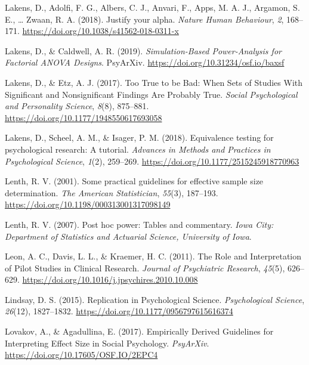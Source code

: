 \documentclass[
  english,
  ,jou, a4paper,floatsintext]{apa6}
\newlength{\cslhangindent}
\newenvironment{cslreferences}%
  {\setlength{\parindent}{0pt}%
  \everypar{\setlength{\hangindent}{\cslhangindent}}\ignorespaces}%
  {\par}
\begin{document}
\begin{cslreferences}
\leavevmode\hypertarget{ref-lakens_justify_2018}{}%
Lakens, D., Adolfi, F. G., Albers, C. J., Anvari, F., Apps, M. A. J., Argamon, S. E., \ldots{} Zwaan, R. A. (2018). Justify your alpha. \emph{Nature Human Behaviour}, \emph{2}, 168--171. \url{https://doi.org/10.1038/s41562-018-0311-x}

\leavevmode\hypertarget{ref-lakens_simulation-based_2019}{}%
Lakens, D., \& Caldwell, A. R. (2019). \emph{Simulation-Based Power-Analysis for Factorial ANOVA Designs}. PsyArXiv. \url{https://doi.org/10.31234/osf.io/baxsf}

\leavevmode\hypertarget{ref-lakens_too_2017}{}%
Lakens, D., \& Etz, A. J. (2017). Too True to be Bad: When Sets of Studies With Significant and Nonsignificant Findings Are Probably True. \emph{Social Psychological and Personality Science}, \emph{8}(8), 875--881. \url{https://doi.org/10.1177/1948550617693058}

\leavevmode\hypertarget{ref-lakens_equivalence_2018}{}%
Lakens, D., Scheel, A. M., \& Isager, P. M. (2018). Equivalence testing for psychological research: A tutorial. \emph{Advances in Methods and Practices in Psychological Science}, \emph{1}(2), 259--269. \url{https://doi.org/10.1177/2515245918770963}

\leavevmode\hypertarget{ref-lenth_practical_2001}{}%
Lenth, R. V. (2001). Some practical guidelines for effective sample size determination. \emph{The American Statistician}, \emph{55}(3), 187--193. \url{https://doi.org/10.1198/000313001317098149}

\leavevmode\hypertarget{ref-lenth_post_2007}{}%
Lenth, R. V. (2007). Post hoc power: Tables and commentary. \emph{Iowa City: Department of Statistics and Actuarial Science, University of Iowa}.

\leavevmode\hypertarget{ref-leon_role_2011}{}%
Leon, A. C., Davis, L. L., \& Kraemer, H. C. (2011). The Role and Interpretation of Pilot Studies in Clinical Research. \emph{Journal of Psychiatric Research}, \emph{45}(5), 626--629. \url{https://doi.org/10.1016/j.jpsychires.2010.10.008}

\leavevmode\hypertarget{ref-lindsay_replication_2015}{}%
Lindsay, D. S. (2015). Replication in Psychological Science. \emph{Psychological Science}, \emph{26}(12), 1827--1832. \url{https://doi.org/10.1177/0956797615616374}

\leavevmode\hypertarget{ref-lovakov_empirically_2017}{}%
Lovakov, A., \& Agadullina, E. (2017). Empirically Derived Guidelines for Interpreting Effect Size in Social Psychology. \emph{PsyArXiv}. \url{https://doi.org/10.17605/OSF.IO/2EPC4}


\end{cslreferences}
\end{document}
